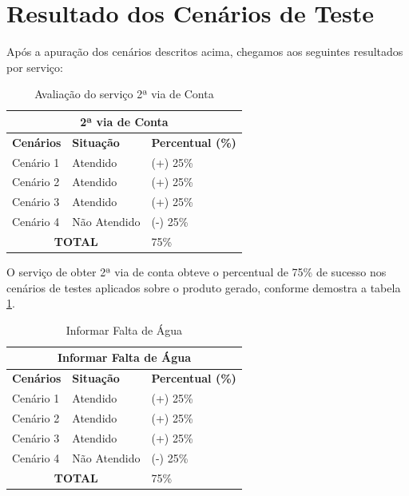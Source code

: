 \section{Resultado dos Cenários de Teste}

Após a apuração dos cenários descritos acima, chegamos aos seguintes resultados por serviço:

\begin{table}[H]
	\center
	\footnotesize
	\caption{Avaliação do serviço 2ª via de Conta }
	\label{tabela:avaliacaoSegundaViaConta}
	\begin{tabular}{|p{3cm}|p{3cm}|p{3cm}|}
		\hline
		\multicolumn{3}{|c|}{\textbf{2ª via de Conta}} \\
		\hline
		\textbf{Cenários}  	& \textbf{Situação} & \textbf{Percentual (\%)}  \\
		\hline		
		Cenário 1			& Atendido 		& (+) 25\% 	\\
		\hline
		Cenário 2 			& Atendido		& (+) 25\% 	\\
		\hline
		Cenário 3 			& Atendido 		& (+) 25\%	\\
		\hline
		Cenário 4			& Não Atendido	& (-) 25\% 	\\
		\hline		
		\multicolumn{2}{|c|}{\textbf{TOTAL}}	& 75\% 	\\
		\hline				
	\end{tabular}
\end{table}

O serviço de obter 2ª via de conta obteve o percentual de 75\% de sucesso nos cenários de testes aplicados sobre o produto gerado, conforme demostra a tabela \ref{tabela:avaliacaoSegundaViaConta}. 


\begin{table}[H]
	\center
	\footnotesize
	\caption{Informar Falta de Água}
	\label{tabela:avaliacaoInformarFaltaAgua}
	\begin{tabular}{|p{3cm}|p{3cm}|p{3cm}|}
		\hline
		\multicolumn{3}{|c|}{\textbf{Informar Falta de Água}} \\
		\hline
		\textbf{Cenários}  	& \textbf{Situação} & \textbf{Percentual (\%)}  \\
		\hline		
		Cenário 1			& Atendido 		& (+) 25\% 	\\
		\hline
		Cenário 2 			& Atendido		& (+) 25\% 	\\
		\hline
		Cenário 3 			& Atendido 		& (+) 25\%	\\
		\hline
		Cenário 4			& Não Atendido	& (-) 25\% 	\\
		\hline		
		\multicolumn{2}{|c|}{\textbf{TOTAL}}	& 75\% 	\\
		\hline				
	\end{tabular}
\end{table}

